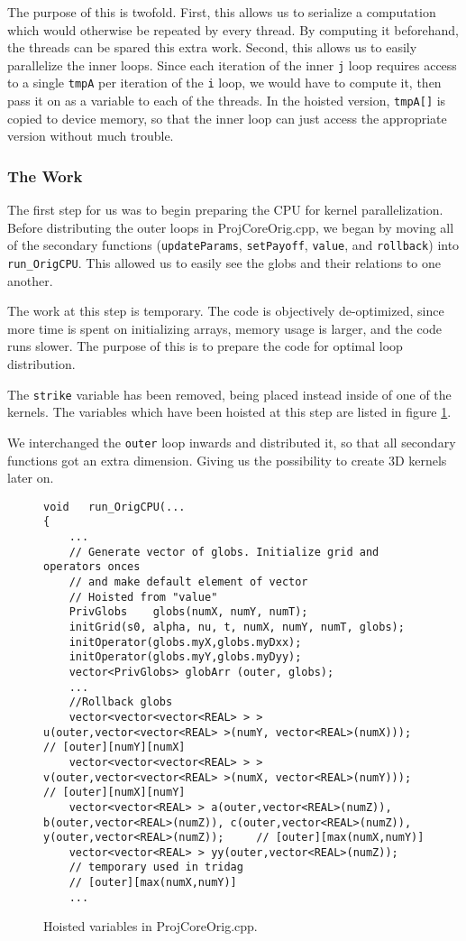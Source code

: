 \documentclass[12pt, oneside]{article}
\begin{document}
The purpose of this is twofold. First, this allows us to serialize a computation which would otherwise be repeated by every thread. By computing it beforehand, the threads can be spared this extra work. Second, this allows us to easily parallelize the inner loops. Since each iteration of the inner \texttt{j} loop requires access to a single \texttt{tmpA} per iteration of the \texttt{i} loop, we would have to compute it, then pass it on as a variable to each of the threads. In the hoisted version, \texttt{tmpA[]} is copied to device memory, so that the inner loop can just access the appropriate version without much trouble.
\subsubsection{The Work}
The first step for us was to begin preparing the CPU for kernel parallelization. Before distributing the outer loops in ProjCoreOrig.cpp, we began by moving all of the secondary functions (\texttt{updateParams}, \texttt{setPayoff}, \texttt{value}, and \texttt{rollback}) into \texttt{run\_OrigCPU}. This allowed us to easily see the globs and their relations to one another.
		
The work at this step is temporary. The code is objectively de-optimized, since more time is spent on initializing arrays, memory usage is larger, and the code runs slower. The purpose of this is to prepare the code for optimal loop distribution.
		
The \texttt{strike} variable has been removed, being placed instead inside of one of the kernels. The variables which have been hoisted at this step are listed in figure \ref{fig:globs}.

We interchanged the \texttt{outer} loop inwards and distributed it, so that all
secondary functions got an extra dimension. Giving us the possibility to create
3D kernels later on.

\begin{figure}[h]
\begin{lstlisting}
void   run_OrigCPU(...
{   
	...
	// Generate vector of globs. Initialize grid and operators onces
	// and make default element of vector
	// Hoisted from "value"
	PrivGlobs    globs(numX, numY, numT);
	initGrid(s0, alpha, nu, t, numX, numY, numT, globs);
	initOperator(globs.myX,globs.myDxx);
	initOperator(globs.myY,globs.myDyy);
	vector<PrivGlobs> globArr (outer, globs);
	...
	//Rollback globs
	vector<vector<vector<REAL> > > u(outer,vector<vector<REAL> >(numY, vector<REAL>(numX)));   // [outer][numY][numX]
	vector<vector<vector<REAL> > > v(outer,vector<vector<REAL> >(numX, vector<REAL>(numY)));   // [outer][numX][numY]
	vector<vector<REAL> > a(outer,vector<REAL>(numZ)), b(outer,vector<REAL>(numZ)), c(outer,vector<REAL>(numZ)), y(outer,vector<REAL>(numZ));     // [outer][max(numX,numY)]
	vector<vector<REAL> > yy(outer,vector<REAL>(numZ));  
	// temporary used in tridag  
	// [outer][max(numX,numY)]
	...
\end{lstlisting}
\caption{ \label{fig:globs} Hoisted variables in ProjCoreOrig.cpp. }
\end{figure}
			
\end{document}
